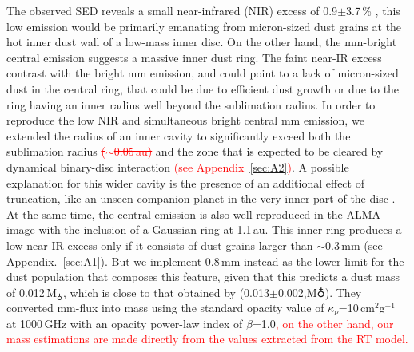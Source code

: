 \documentclass[fleqn,usenatbib,useAMS]{mnras}
\newcommand{\red}[1]{\textcolor{red}{#1}}
\begin{document}
The observed SED reveals a small near-infrared (NIR) excess of 0.9$\pm$3.7\,\% \citep{Francis_2020}, this low emission would be primarily emanating from micron-sized dust grains at the hot inner dust wall of a low-mass inner disc. On the other hand, the mm-bright central emission suggests a massive inner dust ring. The faint near-IR excess contrast with the bright mm emission, and could point to a lack of micron-sized dust in the central ring, that could be due to efficient dust growth or due to the ring having an inner radius well beyond the sublimation radius. In order to reproduce the low NIR and simultaneous bright central mm emission, we extended the radius of an inner cavity to significantly exceed both the sublimation radius \red{\sout{($\sim$0.05\,au)}} and the zone that is expected to be cleared by dynamical binary-disc interaction \red{\sout{\citep[][$\lesssim$0.1\,au]{Art_Lu}} (see Appendix~\ref{sec:A2})}. A possible explanation for this wider cavity is the presence of an additional effect of truncation, like an unseen companion planet in the very inner part of the disc \citep{Francis_2020}. At the same time, the central emission is also well reproduced in the ALMA image with the inclusion of a Gaussian ring at 1.1\,au. This inner ring produces a low near-IR excess only if it consists of dust grains larger than $\sim$0.3\,mm (see Appendix.~\ref{sec:A1}). But we implement 0.8\,mm instead as the lower limit for the dust population that composes this feature, given that this predicts a dust mass of 0.012\,M$_{\earth}$, which is close to that obtained by \citet{Francis_2020} (0.013$\pm$0.002,M${\earth}$). They converted mm-flux into mass using the standard opacity value of $\kappa_{\nu}$=10\,$\mathrm{cm}^2 \mathrm{g}^{-1}$ at 1000\,GHz with an opacity power-law index of $\beta$=1.0\red{, on the other hand, our mass estimations are made directly from the values extracted from the RT model. }
\end{document}
